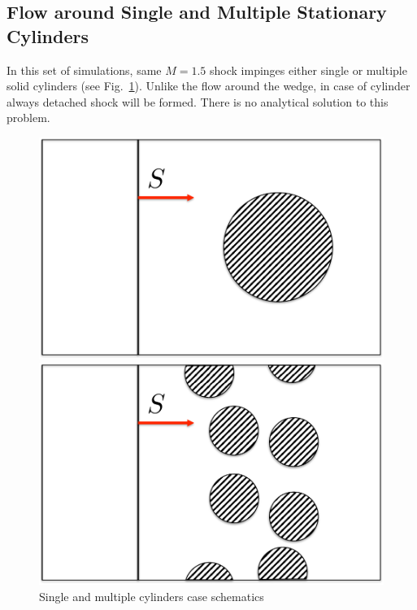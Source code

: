 \subsection{Flow around Single and Multiple Stationary Cylinders}
In this set of simulations, same $M=1.5$ shock impinges either single or multiple solid cylinders (see Fig.~\ref{fig:cyl_scheme}). Unlike the flow around the wedge, in case of cylinder always detached shock will be formed. There is no analytical solution to this problem.
\begin{figure}[h!]
\begin{minipage}{0.5\linewidth}
\includegraphics[scale=0.4]{fig/single_cyl.pdf}
\end{minipage}
\begin{minipage}{0.5\linewidth}
\includegraphics[scale=0.4]{fig/mul_cyl.pdf}
\end{minipage}
\caption{Single and multiple cylinders case schematics} \label{fig:cyl_scheme}
\end{figure}\\
